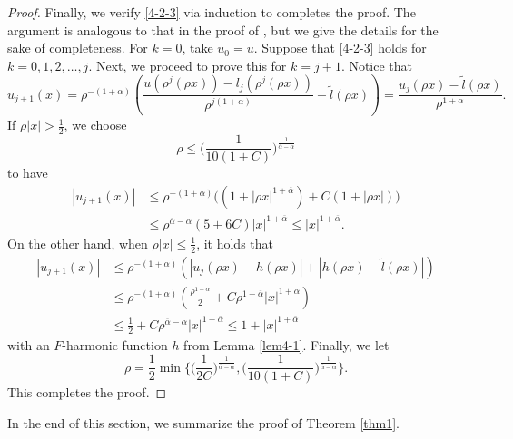 \documentclass[11pt,reqno]{amsart}
\numberwithin{equation}{section}
\begin{document}
\begin{proof}
Finally, we verify \eqref{4-2-3} via induction to completes the proof.
The argument is analogous to that in the proof of \cite[Lemma 3.3]{FRZ25}, but we give the details for the sake of completeness.
For $k=0$, take $u_0=u$. Suppose that \eqref{4-2-3} holds for $k=0,1,2,\dots,j$. Next, we proceed to prove this for $k=j+1$. Notice that
$$
u_{j+1}(x)=\rho^{-(1+\alpha)}\left(\frac{u(\rho^j(\rho x))-l_j(\rho^j(\rho x))}{\rho^{j(1+\alpha)}}-\tilde{l}(\rho x)\right)
=\frac{u_j(\rho x)-\tilde{l}(\rho x)}{\rho^{1+\alpha}}.
$$
If $\rho|x|>\frac{1}{2}$, we choose
$$
\rho\le \biggl(\frac{1}{10(1+C)}\biggr)^\frac{1}{\overline{\alpha}-\alpha}
$$
to have
\begin{align*}
|u_{j+1}(x)|&\le \rho^{-(1+\alpha)}\bigl((1+|\rho x|^{1+\overline{\alpha}})+C(1+|\rho x|)\bigr)\\
&\le\rho^{\overline{\alpha}-\alpha}(5+6C)|x|^{1+\overline{\alpha}}
\le|x|^{1+\overline{\alpha}}.
\end{align*}
On the other hand, when $\rho|x|\le\frac{1}{2}$, it holds that
\begin{align*}
|u_{j+1}(x)|&\le \rho^{-(1+\alpha)}(|u_j(\rho x)-h(\rho x)|+|h(\rho x)-\tilde{l}(\rho x)|)\\
&\le\rho^{-(1+\alpha)}\left(\frac{\rho^{1+\alpha}}{2}+C\rho^{1+\overline{\alpha}}|x|^{1+\overline{\alpha}}\right)\\
&\le\frac{1}{2}+C\rho^{\overline{\alpha}-\alpha}|x|^{1+\overline{\alpha}}
\le1+|x|^{1+\overline{\alpha}}
\end{align*}
with an $F$-harmonic function $h$ from Lemma \ref{lem4-1}. Finally, we let
$$
\rho=\frac{1}{2}\min\biggl\{\biggl(\frac{1}{2C}\biggr)^\frac{1}{\overline{\alpha}-\alpha},\biggl(\frac{1}{10(1+C)}\biggr)^\frac{1}{\overline{\alpha}-\alpha}\biggr\}.
$$
This completes the proof.
\end{proof}

In the end of this section, we summarize the proof of Theorem \ref{thm1}.
\end{document}

